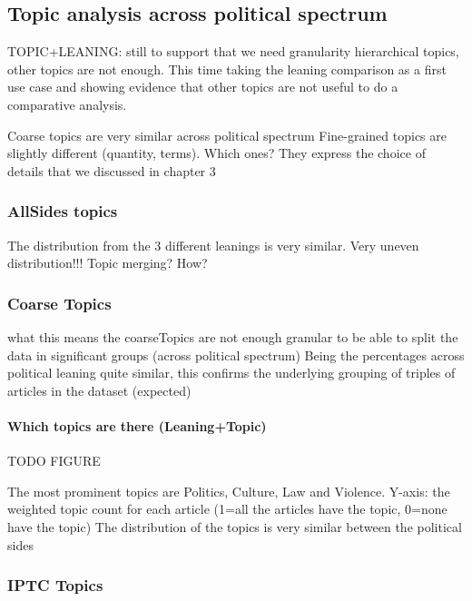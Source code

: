 \subsection{\statusred Topic analysis across political spectrum}
\label{ssec:topics_topics_leaning}
TOPIC+LEANING: still to support that we need granularity hierarchical topics, other topics are not enough. This time taking the leaning comparison as a first use case and showing evidence that other topics are not useful to do a comparative analysis.

Coarse topics are very similar across political spectrum
Fine-grained topics are slightly different (quantity, terms). Which ones? They express the choice of details that we discussed in chapter 3


\subsubsection{AllSides topics}

The distribution from the 3 different leanings is very similar. 
Very uneven distribution!!!
Topic merging? How?

\subsubsection{Coarse Topics}

what this means
the coarseTopics are not enough granular to be able to split the data in significant groups (across political spectrum)
Being the percentages across political leaning quite similar, this confirms the underlying grouping of triples of articles in the dataset (expected)

\paragraph{Which topics are there (Leaning+Topic)}

TODO FIGURE

The most prominent topics are Politics, Culture, Law and Violence.
Y-axis: the weighted topic count for each article (1=all the articles have the topic, 0=none have the topic)
The distribution of the topics is very similar between the political sides

\subsubsection{IPTC Topics}

